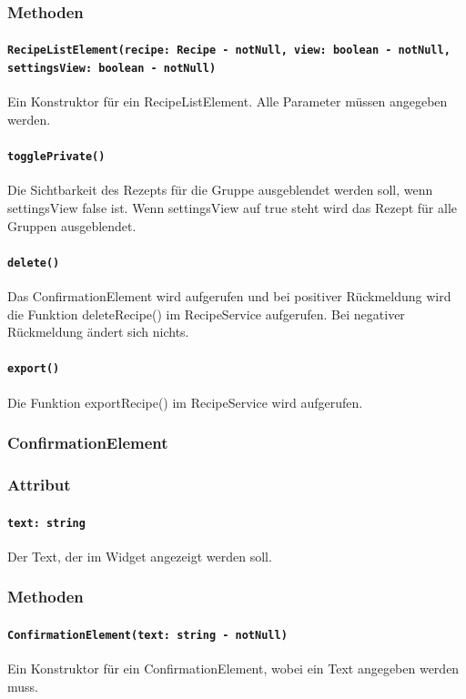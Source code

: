 \documentclass[parskip=full]{scrartcl}
\begin{document}
            \subsubsection*{Methoden}
            \paragraph*{\texttt{RecipeListElement(recipe: Recipe - notNull, view: boolean - notNull, settingsView: boolean - notNull)}} Ein Konstruktor für ein RecipeListElement. Alle Parameter müssen angegeben werden.
            \paragraph*{\texttt{togglePrivate()}} Die Sichtbarkeit des Rezepts für die Gruppe ausgeblendet werden soll, wenn settingsView false ist. Wenn settingsView auf true steht wird das Rezept für alle Gruppen ausgeblendet.
            \paragraph*{\texttt{delete()}} Das ConfirmationElement wird aufgerufen und bei positiver Rückmeldung wird die Funktion deleteRecipe() im RecipeService aufgerufen. Bei negativer Rückmeldung ändert sich nichts.
            \paragraph*{\texttt{export()}} Die Funktion exportRecipe() im RecipeService wird aufgerufen.

    \subsubsection{ConfirmationElement} \label{sec:ConfirmationElement}
        \subsubsection*{Attribut}
            \paragraph*{\texttt{text: string}} Der Text, der im Widget angezeigt werden soll.

        \subsubsection*{Methoden}
            \paragraph*{\texttt{ConfirmationElement(text: string - notNull)}} Ein Konstruktor für ein ConfirmationElement, wobei ein Text angegeben werden muss.
\end{document}
